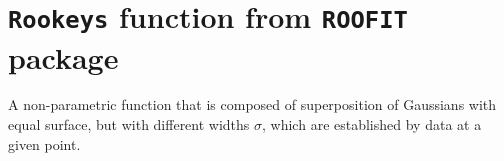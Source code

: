 \section{\texttt{Rookeys} function from \texttt{ROOFIT} package}
\label{RK}
A non-parametric function that is composed of superposition of Gaussians with equal surface, but with different widths $\sigma$, which are established by data at a given point.



